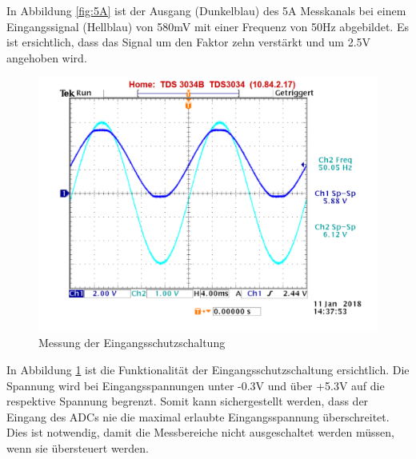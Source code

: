 In Abbildung \ref{fig:5A} ist der Ausgang (Dunkelblau) des 5A Messkanals bei einem Eingangssignal (Hellblau) von 580mV mit einer Frequenz von 50Hz abgebildet. Es ist ersichtlich, dass das Signal um den Faktor zehn verstärkt und um 2.5V angehoben wird.

\begin{figure}[H]
	\includegraphics[width=140mm]{images/qualitatssicherung_U_5Vpp_50Hz.png}
	\caption{Messung der Eingangsschutzschaltung} %
	\label{fig:5V}
\end{figure}

In Abbildung \ref{fig:5V} ist die Funktionalität der Eingangsschutzschaltung ersichtlich. Die Spannung wird bei Eingangsspannungen unter -0.3V und über +5.3V auf die respektive Spannung begrenzt. Somit kann sichergestellt werden, dass der Eingang des ADCs nie die maximal erlaubte Eingangsspannung überschreitet. Dies ist notwendig, damit die Messbereiche nicht ausgeschaltet werden müssen, wenn sie übersteuert werden.

 